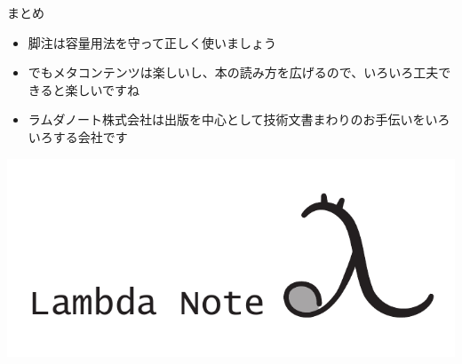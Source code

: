 \documentclass[14pt,dvipdfmx,uplatex]{beamer}
\begin{document}
\begin{frame}[t]{\inhibitglue まとめ}
  \sffamily
  \begin{itemize}
    \item 脚注は容量用法を守って正しく使いましょう
    \item でもメタコンテンツは楽しいし、本の読み方を広げるので、いろいろ工夫できると楽しいですね \pause
    \item ラムダノート株式会社は出版を中心として技術文書まわりのお手伝いをいろいろする会社です
  \end{itemize}
  \begin{center}
    \includegraphics[width=.5\textwidth]{main-logo.pdf}
  \end{center}
\end{frame}
\end{document}
